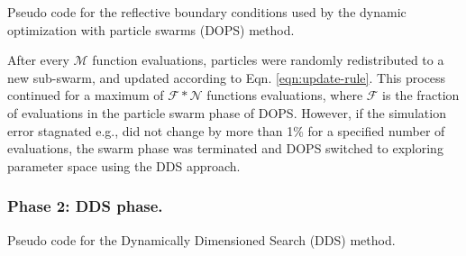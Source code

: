 \documentclass{bmcart}
\begin{document}
\begin{algorithm}
\caption{Pseudo code for the reflective boundary conditions used by the dynamic optimization with particle swarms (DOPS) method.}\label{algo_reflection}
\end{algorithm}

After every $\mathcal{M}$ function evaluations, particles were randomly redistributed to a new sub-swarm, and updated according to Eqn. \eqref{eqn:update-rule}.
This process continued for a maximum of $\mathcal{F}*\mathcal{N}$ functions evaluations, where $\mathcal{F}$ is the fraction of evaluations in the particle swarm phase of DOPS.
However, if the simulation error stagnated e.g., did not change by more than 1\% for a specified number of evaluations, the swarm phase was terminated and DOPS switched to
exploring parameter space using the DDS approach.

\subsubsection*{Phase 2: DDS phase.}
\IncMargin{1em}
\begin{algorithm}
\BlankLine
{}
\caption{Pseudo code for the Dynamically Dimensioned Search (DDS) method.}\label{algo_dds}
\end{algorithm}\DecMargin{1em}
\end{document}
